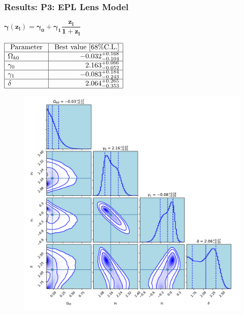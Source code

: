 \documentclass[xcolor=table,bigger]{beamer}
\begin{document}
\begin{frame}
 \frametitle{Results: \textbf{ P3: EPL} Lens Model}
\begin{scriptsize}
$
{\boxed{\boldsymbol{\gamma(z_l)=\gamma_{0}+\gamma_{1} \dfrac{z_{l}}{1+z_{l}}}}}
$
\end{scriptsize}\hspace*{1cm} $\begin{array}{|l|r|}\hline \text { Parameter } & {\text { Best value }[68 \% \mathrm{C.L.}]} \\ \hline \Omega_{k 0} & {-0.032^{+0.168}_{-0.104}} \\ \hline \gamma_{0} & {2.163^{+0.066}_{-0.052}} \\ \hline \gamma_{1} & {-0.083^{+0.184}_{-0.243}} \\ \hline \delta & {2.064^{+0.265}_{-0.353}} \\ \hline\end{array}$



\begin{figure}[ht!]
\centering
\includegraphics[width=52 mm]{distance_Ratio_161_ok_1_ga0_ga1_delt_P3_corner_without_beta_h0_dec}
\end{figure} 
\end{frame}
\end{document}
